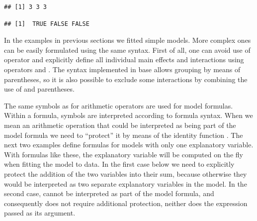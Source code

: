 \documentclass[krantz2]{krantz}\usepackage{knitr}
\begin{document}
\begin{explainbox}
\begin{knitrout}\footnotesize
{}\color{fgcolor}\begin{kframe}
\begin{alltt}
\hlstd{(} \hlopt{~}  \hlopt{~}  \hlopt{~} 
\end{alltt}
\begin{verbatim}
## [1] 3 3 3
\end{verbatim}
\begin{alltt}
\hlstd{(} \hlopt{~}  \hlopt{~}  \hlopt{~} 
\end{alltt}
\begin{verbatim}
## [1]  TRUE FALSE FALSE
\end{verbatim}
\end{kframe}
\end{knitrout}

\end{explainbox}

In the examples in previous sections we fitted simple models. More complex ones can be easily formulated using the same syntax. First of all, one can avoid use of operator \code{*} and explicitly define all individual main effects and interactions using operators \code{+} and \code{:}. The syntax implemented in base \Rlang allows grouping by means of parentheses, so it is also possible to exclude some interactions by combining the use of \code{*} and parentheses.

The same symbols as for arithmetic operators are used for model formulas. Within a formula, symbols are interpreted according to formula syntax. When we mean an arithmetic operation that could be interpreted as being part of the model formula we need to ``protect'' it by means of the identity function . The next two examples define formulas for models with only one explanatory variable. With formulas like these, the explanatory variable will be computed on the fly when fitting the model to data. In the first case below we need to explicitly protect the addition of the two variables into their sum, because otherwise they would be interpreted as two separate explanatory variables in the model. In the second case,  cannot be interpreted as part of the model formula, and consequently does not require additional protection, neither does the expression passed as its argument.
\end{document}
